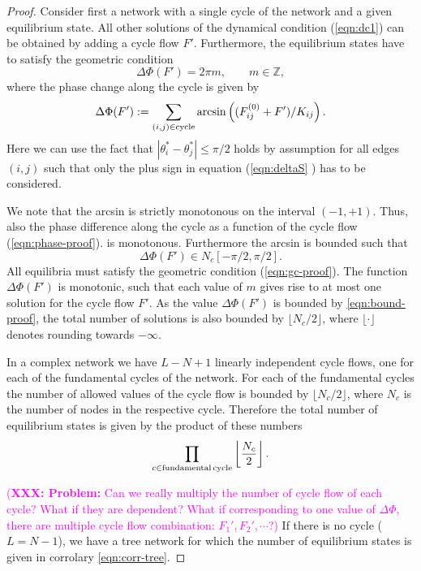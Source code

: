 \documentclass[10pt,aps,pre,preprint,superscriptaddress]{revtex4-1}
\newcommand{\debsankha}[1]{\textcolor{magenta}{#1}}
\newcommand{\be}{\begin{equation}}
\newcommand{\ee}{\end{equation}}
\begin{document}
\begin{proof}
Consider first a network with a single cycle of the network and a given 
equilibrium state. All other solutions of the dynamical condition (\ref{eqn:dc1}) 
can be obtained by adding a cycle flow $F'$. Furthermore, the equilibrium
states have to satisfy the geometric condition  
 \be
    \Delta \Phi(F') = 2 \pi m, \qquad m \in \mathbb{Z},
   \label{eqn:gc-proof}
\ee
where the phase change along the cycle is given by
\be
   \Delta \Phi(F') := \sum_{(i,j) \in {\rm cycle}} \arcsin
    \left( ( F^{(0)}_{ij} + F') /K_{ij} \right).  
  \label{eqn:phase-proof}
\ee
Here we can use the fact that $|\theta_i^*  - \theta_j^*| \le \pi/2$ 
holds by assumption for all edges $(i,j)$ such that only the plus 
sign in equation (\ref{eqn:deltaS} ) has to be considered. 

We note that the arcsin is strictly monotonous on the interval 
$(-1,+1)$. Thus, also the phase difference along the cycle as
a function of the cycle flow (\ref{eqn:phase-proof}).
is monotonous. Furthermore the arcsin is bounded such that
\be
   \Delta \Phi(F') \in N_c [-\pi/2, \pi/2].
    \label{eqn:bound-proof}
\ee
All equilibria must satisfy the geometric condition (\ref{eqn:gc-proof}).
The function $\Delta \Phi(F')$ is monotonic, such that each value 
of $m$ gives rise to at most one solution for the cycle flow $F'$. 
As the value $ \Delta \Phi(F')$ is bounded by \ref{eqn:bound-proof}, 
the total number of solutions is also bounded by $\lfloor N_c/2 \rfloor$,
where $\lfloor \cdot \rfloor$ denotes rounding towards $-\infty$.
 
In a complex network we have $L-N+1$ linearly independent
cycle flows, one for each of the fundamental cycles of the
network. For each of the fundamental cycles the number
of allowed values of the cycle flow is bounded by 
$\lfloor N_c/2 \rfloor$, 
where $N_c$ is the number of nodes in the respective cycle. 
Therefore the total number of equilibrium states is given by 
the product of these numbers
\be
   \prod_{c \in \rm{fundamental \, cycle}} \left\lfloor \frac{N_c}{2} \right \rfloor.
\ee

\debsankha{(\textbf{XXX: Problem:} Can we really multiply the number of cycle flow of each cycle? 
What if they are dependent? What if corresponding to one value of $\Delta\Phi$, 
there are multiple cycle flow combination: $F_1',F_2',\cdots$?)}
If there is no cycle ($L=N-1$), we have a tree network for which
the number of equilibrium states is given in corrolary 
\ref{eqn:corr-tree}.
\end{proof}
\end{document}
